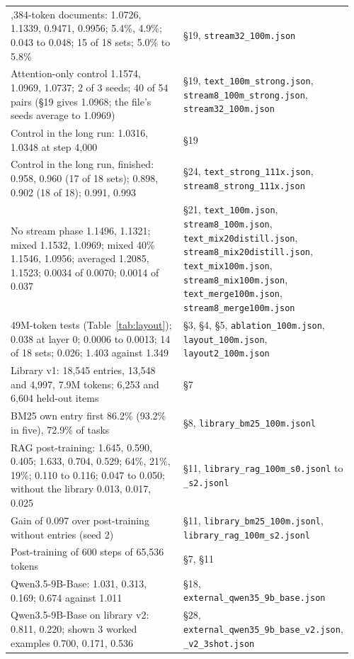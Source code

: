 \documentclass[10pt,twocolumn,letterpaper]{article}
\newcommand{\sect}[1]{\S#1}
\begin{document}
\begin{longtable}{@{}>{\raggedright\arraybackslash}p{0.56\linewidth} >{\raggedright\arraybackslash}p{0.40\linewidth}@{}}
16,384-token documents: 1.0726, 1.1339, 0.9471, 0.9956; 5.4\%, 4.9\%; 0.043 to 0.048; 15 of 18 sets; 5.0\% to 5.8\% & \sect{19}, \texttt{stream32\_100m.json} \\
Attention-only control 1.1574, 1.0969, 1.0737; 2 of 3 seeds; 40 of 54 pairs (\sect{19} gives 1.0968; the file's seeds average to 1.0969) & \sect{19}, \texttt{text\_100m\_strong.json}, \texttt{stream8\_100m\_strong.json}, \texttt{stream32\_100m.json} \\
Control in the long run: 1.0316, 1.0348 at step 4,000 & \sect{19} \\
Control in the long run, finished: 0.958, 0.960 (17 of 18 sets); 0.898, 0.902 (18 of 18); 0.991, 0.993 & \sect{24}, \texttt{text\_strong\_111x.json}, \texttt{stream8\_strong\_111x.json} \\
No stream phase 1.1496, 1.1321; mixed 1.1532, 1.0969; mixed 40\% 1.1546, 1.0956; averaged 1.2085, 1.1523; 0.0034 of 0.0070; 0.0014 of 0.037 & \sect{21}, \texttt{text\_100m.json}, \texttt{stream8\_100m.json}, \texttt{text\_mix20distill.json}, \texttt{stream8\_mix20distill.json}, \texttt{text\_mix100m.json}, \texttt{stream8\_mix100m.json}, \texttt{text\_merge100m.json}, \texttt{stream8\_merge100m.json} \\
49M-token tests (Table~\ref{tab:layout}); 0.038 at layer 0; 0.0006 to 0.0013; 14 of 18 sets; 0.026; 1.403 against 1.349 & \sect{3}, \sect{4}, \sect{5}, \texttt{ablation\_100m.json}, \texttt{layout\_100m.json}, \texttt{layout2\_100m.json} \\
Library v1: 18,545 entries, 13,548 and 4,997, 7.9M tokens; 6,253 and 6,604 held-out items & \sect{7} \\
BM25 own entry first 86.2\% (93.2\% in five), 72.9\% of tasks & \sect{8}, \texttt{library\_bm25\_100m.jsonl} \\
RAG post-training: 1.645, 0.590, 0.405; 1.633, 0.704, 0.529; 64\%, 21\%, 19\%; 0.110 to 0.116; 0.047 to 0.050; without the library 0.013, 0.017, 0.025 & \sect{11}, \texttt{library\_rag\_100m\_s0.jsonl} to \texttt{\_s2.jsonl} \\
Gain of 0.097 over post-training without entries (seed 2) & \sect{11}, \texttt{library\_bm25\_100m.jsonl}, \texttt{library\_rag\_100m\_s2.jsonl} \\
Post-training of 600 steps of 65,536 tokens & \sect{7}, \sect{11} \\
Qwen3.5-9B-Base: 1.031, 0.313, 0.169; 0.674 against 1.011 & \sect{18}, \texttt{external\_qwen35\_9b\_base.json} \\
Qwen3.5-9B-Base on library v2: 0.811, 0.220; shown 3 worked examples 0.700, 0.171, 0.536 & \sect{28}, \texttt{external\_qwen35\_9b\_base\_v2.json}, \texttt{\_v2\_3shot.json} \\

\end{longtable}
\end{document}
